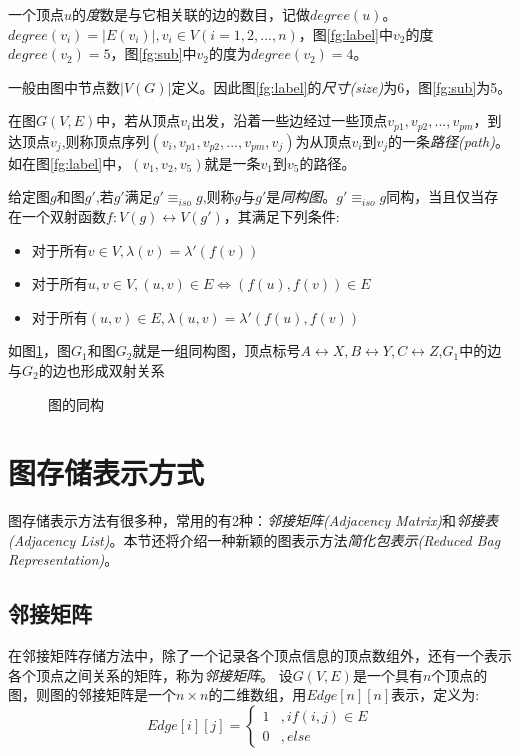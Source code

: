 \documentclass{XDBAthesis}
\begin{document}
\begin{defn}
    一个顶点$u$的\emph{度}数是与它相关联的边的数目，记做$degree(u)$。$degree(v_i )=|E(v_i )|,v_i \in V(i=1,2,...,n)$，图\ref{fg:label}中$v_2 $的度$degree(v_2 )=5$，图\ref{fg:sub}中$v_2 $的度为$degree(v_2)=4$。
\end{defn}
\begin{defn}
    一般由图中节点数$|V(G)|$定义。因此图\ref{fg:label}的\emph{尺寸(size)}为6，图\ref{fg:sub}为5。
\end{defn}
\begin{defn}[路径]
在图$G(V,E)$中，若从顶点$v_i$出发，沿着一些边经过一些顶点$v_{p1},v_{p2},...,v_{pm}$，到达顶点$v_j $,则称顶点序列$(v_{i},v_{p1},v_{p2},...,v_{pm},v_{j})$为从顶点$v_i $到$v_j $的一条\emph{路径(path)}。如在图\ref{fg:label}中，$(v_{1},v_{2},v_{5})$就是一条$v_1 $到$v_5 $的路径。  
\end{defn}
\begin{defn}[图的同构]
给定图$g$和图$g'$,若$g'$满足$g'\equiv_{iso}g$,则称$g$与$g'$是\emph{同构图}。$g'\equiv_{iso}g$同构，当且仅当存在一个双射函数$f:V(g)\leftrightarrow V(g')$，其满足下列条件:
\begin{itemize}
    \item 对于所有$v\in V,\lambda(v)=\lambda '(f(v))$
    \item 对于所有$u,v\in V,(u,v)\in E\Leftrightarrow (f(u),f(v))\in E$
    \item 对于所有$(u,v)\in E,\lambda(u,v)=\lambda '(f(u),f(v)) $
\end{itemize}  
\end{defn}
如图\ref{fg:iso}，图$G_1$和图$G_2$就是一组同构图，顶点标号$A\leftrightarrow X,B\leftrightarrow Y,C\leftrightarrow Z$,$G_1$中的边与$G_2$的边也形成双射关系
\begin{figure}[htb]
    \centering
    \subfigure[$G_1$]{
        
    }
    \subfigure[$G_2$]{
        
    }
    \caption{图的同构}
    \label{fg:iso}
\end{figure}

\section{图存储表示方式}
图存储表示方法有很多种，常用的有2种：\emph{邻接矩阵(Adjacency Matrix)}和\emph{邻接表(Adjacency List)}。本节还将介绍一种新颖的图表示方法\emph{简化包表示(Reduced Bag Representation)}\cite{ghash}。
\subsection{邻接矩阵}
    在邻接矩阵存储方法中，除了一个记录各个顶点信息的顶点数组外，还有一个表示各个顶点之间关系的矩阵，称为\emph{邻接矩阵}。
设$G(V,E)$是一个具有$n$个顶点的图，则图的邻接矩阵是一个$n\times n$的二维数组，用$Edge[n][n]$表示，定义为:
\begin{equation}
    Edge[i][j]=\left\{
    \begin{aligned}
        1 & , if (i,j)\in E \\
        0 & , else    
    \end{aligned}\right. 
\end{equation}
\end{document}
